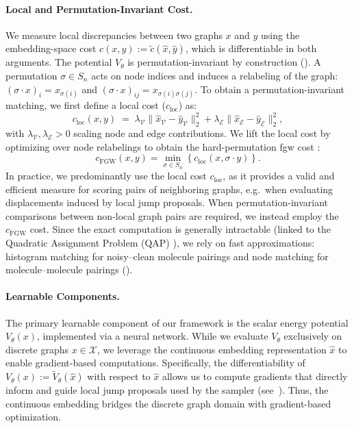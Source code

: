\paragraph{Local and Permutation-Invariant Cost.} We measure local discrepancies between two graphs $x$ and $y$ using the embedding-space cost $
    c(x,y) := \tilde c(\hat{x},\hat{y})$,
which is differentiable in both arguments. The potential $V_\theta$ is permutation-invariant by construction (). %
A permutation $\sigma\in S_n$ acts on node indices and induces a relabeling of the graph: $(\sigma\cdot x)_i=x_{\sigma(i)}$ and $(\sigma\cdot x)_{ij}=x_{\sigma(i)\sigma(j)}$. To obtain a permutation-invariant matching, we first define a local cost ($c_{\mathrm{loc}}$) as:
\begin{equation}\label{eq:loc-cost}
c_{\mathrm{loc}}(x,y)
\;=\;
\lambda_\mathcal{V}\|\hat{x}_{\mathcal{V}}-\hat{y}_{\mathcal{V}}\|^2_2
+
\lambda_\mathcal{E}\|\hat{x}_{\mathcal{E}}-\hat{y}_{\mathcal{E}}\|^2_2,
\end{equation}
with $\lambda_\mathcal{V},\lambda_\mathcal{E}>0$ scaling node and edge contributions. We lift the local cost by optimizing over node relabelings to obtain the hard-permutation \gls{fgw} cost \citep{vayer2019optimal}:
\begin{equation}\label{eq:fgw-cost}
c_{\mathrm{FGW}}(x,y)
=
\min_{\sigma\in S_n}
\left\{
c_{\mathrm{loc}}(x,\sigma\cdot y)
\right\}.
\end{equation}
In practice, we predominantly use the local cost $c_{\mathrm{loc}}$, as it provides a valid and efficient measure for scoring pairs of neighboring graphs, e.g.\ when evaluating displacements induced by local jump proposals. When permutation-invariant comparisons between non-local graph pairs are required, we instead employ the $c_{\mathrm{FGW}}$ cost. Since the exact computation is generally intractable (linked to the Quadratic Assignment Problem (QAP) \citep{vayer2019optimal}), we rely on fast approximations: histogram matching for noisy--clean molecule pairings and node matching for molecule--molecule pairings ().



\paragraph{Learnable Components.}
The primary learnable component of our framework is the scalar energy potential $V_\theta(x)$, implemented via a neural network. While we evaluate $V_\theta$ exclusively on discrete graphs $x \in \mathcal{X}$, we leverage the continuous embedding representation $\hat{x}$ to enable gradient-based computations. Specifically, the differentiability of $V_\theta(x):=\tilde{V}_\theta(\hat{x})$ with respect to $\hat{x}$ allows us to compute gradients that directly inform and guide local jump proposals used by the sampler (see~). Thus, the continuous embedding bridges the discrete graph domain with gradient-based optimization.


